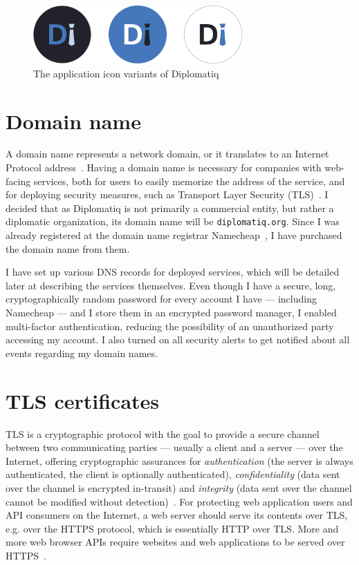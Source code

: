 \begin{figure}[!htb]
    \centering
    \includegraphics[width=8cm]{figures/diplomatiq-app-icons.pdf}
    \caption{The application icon variants of Diplomatiq}
    \label{fig:diplomatiq-app-icons}
\end{figure}

\section{Domain name}

A domain name represents a network domain, or it translates to an Internet Protocol address~\cite{rfc1035}. Having a domain name is necessary for companies with web-facing services, both for users to easily memorize the address of the service, and for deploying security measures, such as Transport Layer Security (TLS)~\cite{rfc8446}. I decided that as Diplomatiq is not primarily a commercial entity, but rather a diplomatic organization, its domain name will be \lstinline{diplomatiq.org}. Since I was already registered at the domain name registrar Namecheap~\cite{namecheap-website}, I have purchased the domain name from them.

I have set up various DNS records for deployed services, which will be detailed later at describing the services themselves. Even though I have a secure, long, cryptographically random password for every account I have — including Namecheap — and I store them in an encrypted password manager, I enabled multi-factor authentication, reducing the possibility of an unauthorized party accessing my account. I also turned on all security alerts to get notified about all events regarding my domain names.

\section{TLS certificates}

TLS is a cryptographic protocol with the goal to provide a secure channel between two communicating parties — usually a client and a server — over the Internet, offering cryptographic assurances for \emph{authentication} (the server is always authenticated, the client is optionally authenticated), \emph{confidentiality} (data sent over the channel is encrypted in-transit) and \emph{integrity} (data sent over the channel cannot be modified without detection)~\cite{rfc8446}. For protecting web application users and API consumers on the Internet, a web server should serve its contents over TLS, e.g. over the HTTPS protocol, which is essentially HTTP over TLS. More and more web browser APIs require websites and web applications to be served over HTTPS~\cite{secure-context-features}.

